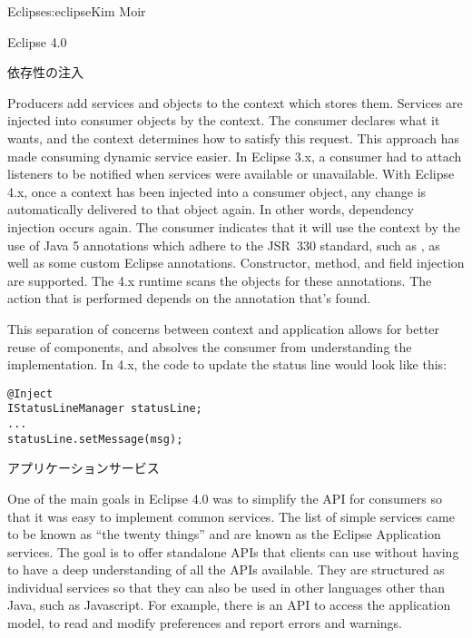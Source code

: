 \begin{aosachapter}{Eclipse}{s:eclipse}{Kim Moir}
\begin{aosasect1}{Eclipse 4.0}
\begin{aosasect2}{依存性の注入}

Producers add services and objects to the context which stores them.
Services are injected into consumer objects by the context. The
consumer declares what it wants, and the context determines how to
satisfy this request. This approach has made consuming dynamic service
easier. In Eclipse 3.x, a consumer had to attach listeners to be
notified when services were available or unavailable. With Eclipse
4.x, once a context has been injected into a consumer object, any
change is automatically delivered to that object again. In other
words, dependency injection occurs again. The consumer indicates that
it will use the context by the use of Java 5 annotations which adhere
to the JSR~330 standard, such as , as well as some
custom Eclipse annotations. Constructor, method, and field injection
are supported.  The 4.x runtime scans the objects for these
annotations. The action that is performed depends on the annotation
that's found.

This separation of concerns between context and application allows for
better reuse of components, and absolves the consumer from
understanding the implementation.  In 4.x, the code to update the
status line would look like this:

\begin{verbatim}
@Inject
IStatusLineManager statusLine;
...
statusLine.setMessage(msg);
\end{verbatim}

\end{aosasect2}

\begin{aosasect2}{アプリケーションサービス}

One of the main goals in Eclipse 4.0 was to simplify the API for
consumers so that it was easy to implement common services. The list
of simple services came to be known as ``the twenty things'' and are
known as the Eclipse Application services. The goal is to offer
standalone APIs that clients can use without having to have a deep
understanding of all the APIs available. They are structured as
individual services so that they can also be used in other languages
other than Java, such as Javascript.  For example, there is an API to
access the application model, to read and modify preferences and
report errors and warnings.


\end{aosasect2}
\end{aosasect1}
\end{aosachapter}
